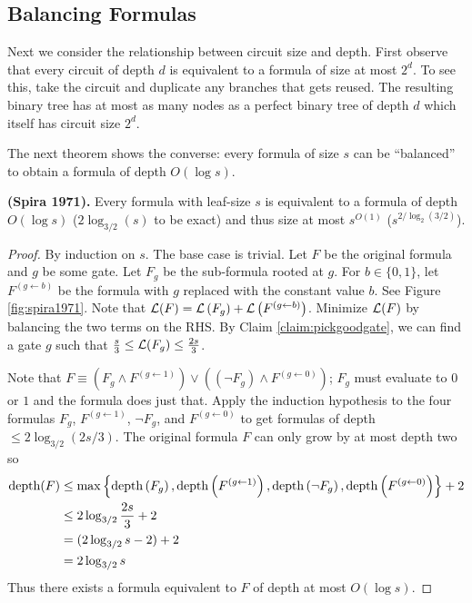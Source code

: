 \documentclass[11pt]{article}
\begin{document}
	\subsection{Balancing Formulas}
	Next we consider the relationship between circuit size and depth. First observe that every circuit of depth $d$ is equivalent to a formula of size  at most $2^d$. To see this, take the circuit and duplicate any branches that gets reused. The resulting binary tree has at most as many nodes as a perfect binary tree of depth $d$ which itself has circuit size $2^d$.   
	
	The next theorem shows the converse: every formula of size $s$ can be ``balanced'' to obtain a formula of depth $O(\log s)$.
	\begin{theorem}
		\textbf{(Spira 1971).} Every formula with leaf-size $s$ is equivalent to a formula of depth $O(\log s)$ ($2\log_{3/2}(s)$ to be exact) and thus size at most $s^{O(1)}$ ($s^{2/\log_2(3/2)}$).
	\end{theorem}
	\begin{proof}
		By induction on $s$. The base case is trivial. Let $F$ be the original formula and $g$ be some gate. Let $F_g$ be the sub-formula rooted at $g$. For $b \in \{0,1\}$, let $F^{(g \leftarrow b)}$ be the formula with $g$ replaced with the constant value $b$. See Figure \ref{fig:spira1971}. Note that $\mathcal{L}(F) = \mathcal{L}\left(F_g\right) + \mathcal{L}\left(F^{\left(g \leftarrow b\right)}\right)$. Minimize $\mathcal{L}(F)$ by balancing the two terms on the RHS. By Claim \ref{claim:pickgoodgate}, we can find a gate $g$ such that $\frac{s}{3} \leq \mathcal{L}(F_g) \leq \frac{2s}{3}$. 
		
		
		Note that $F \equiv \left(F_g \land F^{(g \leftarrow 1)}\right) \lor \left((\lnot F_g) \land F^{(g \leftarrow 0)}\right)$; $F_g$ must evaluate to $0$ or $1$ and the formula does just that. Apply the induction hypothesis to the four formulas $F_g$, $F^{(g \leftarrow 1)}$, $\lnot F_g$, and $F^{(g \leftarrow 0)}$ to get formulas of depth $\leq 2 \log_{3/2}(2s/3)$. The original formula $F$ can only grow by at most depth two so
		\begin{align*}
			\operatorname*{depth}(F) &\leq \max\left\{\operatorname*{depth}\left(F_g\right), \operatorname*{depth}\left(F^{(g \leftarrow 1)}\right), \operatorname*{depth}\left(\lnot F_g\right), \operatorname*{depth}\left(F^{(g \leftarrow 0)}\right)\right\} + 2\\
			&\leq 2\log_{3/2}\frac{2s}{3} + 2\\ 
			&= (2\log_{3/2}s - 2) + 2\\
			&= 2\log_{3/2}s
		\end{align*} 
		Thus there exists a formula equivalent to $F$ of depth at most $O(\log s)$.
	\end{proof}
	
\end{document}
